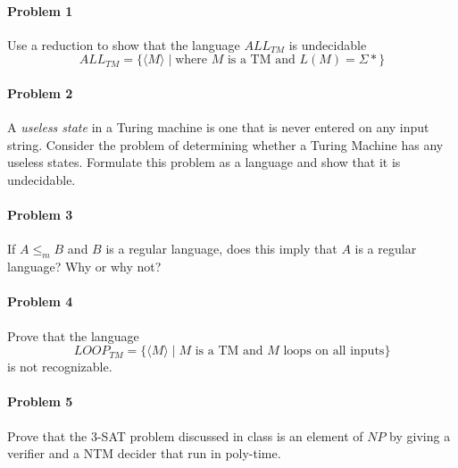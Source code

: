 \documentclass{article}
\begin{document}
\paragraph{Problem 1} Use a reduction to show that the language $ALL_{TM}$ is undecidable
\[ALL_{TM} = \{ \langle M \rangle \;|\; \mbox{where $M$ is a TM and $L(M) = \Sigma*$} \}\]

\paragraph{Problem 2} A {\em useless state} in a Turing machine
is one that is never entered on any input string.  Consider the 
problem of determining whether a Turing Machine has any useless 
states.  Formulate this problem as a language and show that it 
is undecidable.

\paragraph{Problem 3} If $A \leq_m B$ and $B$ is a regular language,
does this imply that $A$ is a regular language? Why or why not?

\paragraph{Problem 4} Prove that the language
\[ LOOP_{TM} = \{ \langle M \rangle \;|\; M \text{ is a TM and $M$ loops on all inputs} \} \]
is not recognizable.

\paragraph{Problem 5} Prove that the 3-SAT problem discussed in class is an element of $NP$ by
giving a verifier and a NTM decider that run in poly-time.
\end{document}
